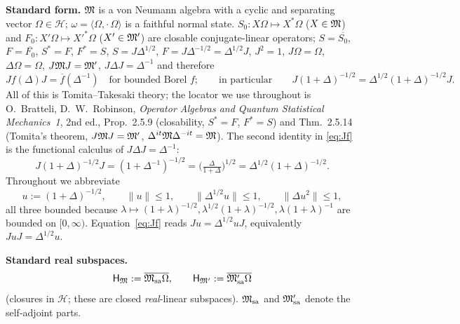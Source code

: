 \documentclass[11pt]{article}
\newcommand{\Om}{\Omega}
\newcommand{\Hil}{\mathcal H}
\newcommand{\Msa}{\cM_{\mathrm{sa}}}
\newcommand{\Mpsa}{\cM'_{\mathrm{sa}}}
\newcommand{\HM}{\mathsf H_{\cM}}
\newcommand{\HMp}{\mathsf H_{\cM'}}
\newcommand{\ip}[2]{\langle #1,#2\rangle}
\newcommand{\norm}[1]{\lVert #1\rVert}
\begin{document}
\textbf{Standard form.}  $\mathfrak M$ is a von Neumann algebra with a cyclic and separating vector $\Om\in\Hil$;
$\omega=\ip{\Om}{\cdot\,\Om}$ is a faithful normal state.  $S_0:X\Om\mapsto X^*\Om$ ($X\in\mathfrak M$) and
$F_0:X'\Om\mapsto X'^*\Om$ ($X'\in\mathfrak M'$) are closable conjugate-linear operators; $S=\overline{S_0}$, $F=\overline{F_0}$,
$S^*=F$, $F^*=S$, $S=J\Delta^{1/2}$, $F=J\Delta^{-1/2}=\Delta^{1/2}J$, $J^2=1$, $J\Om=\Om$, $\Delta\Om=\Om$,
$J\mathfrak M J=\mathfrak M'$, $J\Delta J=\Delta^{-1}$ and therefore
\begin{equation}\label{eq:Jf}
 Jf(\Delta)J=\overline f(\Delta^{-1})\quad\text{for bounded Borel }f;\qquad\text{in particular}\qquad
 J(1+\Delta)^{-1/2}=\Delta^{1/2}(1+\Delta)^{-1/2}J .
\end{equation}
All of this is Tomita--Takesaki theory; the locator we use throughout is
O.~Bratteli, D.~W.~Robinson, \emph{Operator Algebras and Quantum Statistical Mechanics~1}, 2nd ed., Prop.~2.5.9
(closability, $S^*=F$, $F^*=S$) and Thm.~2.5.14 (Tomita's theorem, $J\mathfrak M J=\mathfrak M'$, $\Delta^{it}\mathfrak M\Delta^{-it}=\mathfrak M$).
The second identity in \eqref{eq:Jf} is the functional calculus of $J\Delta J=\Delta^{-1}$:
\begin{equation}\label{eq:Jf-proof}
 J(1+\Delta)^{-1/2}J=(1+\Delta^{-1})^{-1/2}=\bigl(\tfrac{\Delta}{1+\Delta}\bigr)^{1/2}=\Delta^{1/2}(1+\Delta)^{-1/2}.
\end{equation}
Throughout we abbreviate
\begin{equation}\label{eq:u-def}
 u:=(1+\Delta)^{-1/2},\qquad \norm{u}\le1,\qquad \norm{\Delta^{1/2}u}\le1,\qquad \norm{\Delta u^2}\le 1,
\end{equation}
all three bounded because $\lambda\mapsto(1+\lambda)^{-1/2},\lambda^{1/2}(1+\lambda)^{-1/2},\lambda(1+\lambda)^{-1}$
are bounded on $[0,\infty)$.  Equation~\eqref{eq:Jf} reads $Ju=\Delta^{1/2}uJ$, equivalently $JuJ=\Delta^{1/2}u$.

\textbf{Standard real subspaces.}
\begin{equation}\label{eq:realsub}
 \HM:=\overline{\Msa\Om},\qquad \HMp:=\overline{\Mpsa\Om}
\end{equation}
(closures in $\Hil$; these are closed \emph{real}-linear subspaces).  $\Msa$ and $\Mpsa$ denote the self-adjoint parts.
\end{document}
